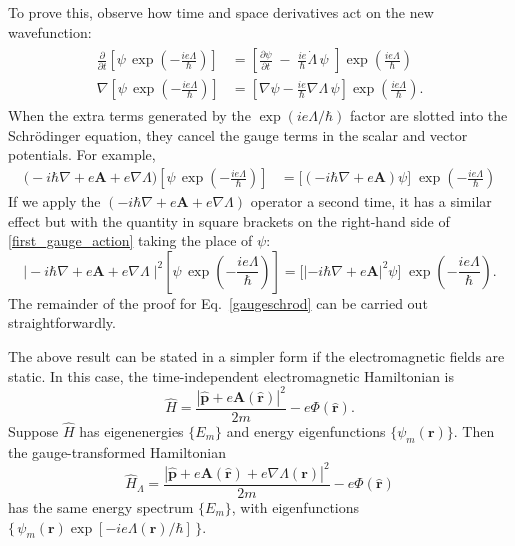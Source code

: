 \documentclass[pra,12pt]{revtex4}
\begin{document}
To prove this, observe how time and space derivatives act on the new
wavefunction:
\begin{align}
  \begin{aligned}
    \frac{\partial}{\partial t} \left[\psi \, \exp\left(-\frac{ie\Lambda}{\hbar}\right)\right] &=
    \left[\frac{\partial\psi}{\partial t} \;-\; \frac{ie}{\hbar} \dot{\Lambda}\, \psi
      \,\, \right] \exp\left(\frac{ie\Lambda}{\hbar}\right)\\
    \nabla \left[\psi \, \exp\left(-\frac{ie\Lambda}{\hbar}\right)\right] &=
    \left[\nabla \psi - \frac{ie}{\hbar} \nabla \Lambda \,\psi \right] \exp\left(\frac{ie\Lambda}{\hbar}\right).
  \end{aligned}
\end{align}
When the extra terms generated by the $\exp(ie\Lambda/\hbar)$ factor
are slotted into the Schr\"odinger equation, they cancel the gauge
terms in the scalar and vector potentials.  For example,
\begin{align}
  \Big(-i\hbar\nabla + e\mathbf{A} + e\nabla\Lambda\Big)
  \left[\psi \, \exp\left(-\frac{ie\Lambda}{\hbar}\right)\right] &=
  \Big[\left(-i\hbar\nabla + e\mathbf{A}\right)\psi\Big]\;
  \exp\left(-\frac{ie\Lambda}{\hbar}\right)
  \label{first_gauge_action}
\end{align}
If we apply the $(-i\hbar\nabla + e\mathbf{A} + e\nabla\Lambda)$
operator a second time, it has a similar effect but with the quantity
in square brackets on the right-hand side of
\eqref{first_gauge_action} taking the place of $\psi$:
\begin{equation}
  \Big|-i\hbar\nabla + e\mathbf{A} + e\nabla\Lambda\;\Big|^2
  \left[\psi \, \exp\left(-\frac{ie\Lambda}{\hbar}\right)\right]  
  =   \Big[\left|-i\hbar\nabla + e\mathbf{A}\right|^2\psi\Big]\;
  \exp\left(-\frac{ie\Lambda}{\hbar}\right).
\end{equation}
The remainder of the proof for Eq.~\eqref{gaugeschrod} can be carried
out straightforwardly.

The above result can be stated in a simpler form if the
electromagnetic fields are static.  In this case, the time-independent
electromagnetic Hamiltonian is
\begin{equation}
  \hat{H} = \frac{|\hat{\mathbf{p}}+e\mathbf{A}(\hat{\mathbf{r}})|^2}{2m}
  - e\Phi(\hat{\mathbf{r}}).
\end{equation}
Suppose $\hat{H}$ has eigenenergies $\{E_m \}$ and energy
eigenfunctions $\{\psi_m(\mathbf{r})\}$.  Then the gauge-transformed
Hamiltonian
\begin{equation}
  \hat{H}_\Lambda = \frac{|\hat{\mathbf{p}}+e\mathbf{A}(\hat{\mathbf{r}}) + e\nabla\Lambda(\mathbf{r})|^2}{2m}
  - e\Phi(\hat{\mathbf{r}})
\end{equation}
has the same energy spectrum $\{E_m\}$, with eigenfunctions
$\{\,\psi_m(\mathbf{r}) \exp[-ie\Lambda(\mathbf{r})/\hbar]\,\}$.
\end{document}
